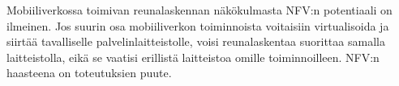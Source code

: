 Mobiiliverkossa toimivan reunalaskennan näkökulmasta NFV:n potentiaali on ilmeinen. Jos suurin osa mobiiliverkon toiminnoista voitaisiin virtualisoida ja siirtää tavalliselle palvelinlaitteistolle, voisi reunalaskentaa suorittaa samalla laitteistolla, eikä se vaatisi erillistä laitteistoa omille toiminnoilleen.
NFV:n haasteena on toteutuksien puute. 